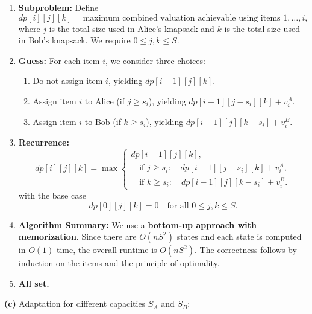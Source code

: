 \documentclass[11pt]{article}
\begin{document}
    \begin{enumerate}
        \item \textbf{Subproblem:}  
        Define 
        \[
        dp[i][j][k] = \text{maximum combined valuation achievable using items } 1,\dots,i,
        \]
        where \(j\) is the total size used in Alice's knapsack and \(k\) is the total size used in Bob's knapsack. We require \(0 \le j,k \le S\).
        
        \item \textbf{Guess:}  
        For each item \(i\), we consider three choices:
        \begin{enumerate}
            \item Do not assign item \(i\), yielding \(dp[i-1][j][k]\).
            \item Assign item \(i\) to Alice (if \(j\ge s_i\)), yielding \(dp[i-1][j-s_i][k] + v_i^A\).
            \item Assign item \(i\) to Bob (if \(k\ge s_i\)), yielding \(dp[i-1][j][k-s_i] + v_i^B\).
        \end{enumerate}
        
        \item \textbf{Recurrence:}  
        \[
        dp[i][j][k] = \max \left\{
        \begin{array}{l}
        dp[i-1][j][k],\\[1mm]
        \quad \text{if } j \ge s_i: \quad dp[i-1][j-s_i][k] + v_i^A,\\[1mm]
        \quad \text{if } k \ge s_i: \quad dp[i-1][j][k-s_i] + v_i^B.
        \end{array}
        \right.
        \]
        with the base case 
        \[
        dp[0][j][k] = 0 \quad \text{for all } 0\le j,k\le S.
        \]
        
        \item \textbf{Algorithm Summary:}  
        We use a \textbf{bottom-up approach with memorization}. Since there are \(O(nS^2)\) states and each state is computed in \(O(1)\) time, the overall runtime is \(O(nS^2)\). The correctness follows by induction on the items and the principle of optimality.
        
        \item \textbf{All set.}
    \end{enumerate}
    
    \medskip
    
    \textbf{(c)} Adaptation for different capacities \(S_A\) and \(S_B\):
    
\end{document}
